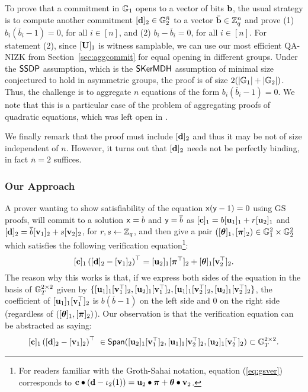 To prove that a commitment in $\mathbb{G}_1$ opens to a vector of bits $\mathbf{b}$, the usual strategy is to compute another commitment $[\mathbf{d}]_2\in\mathbb{G}_2^{\bar{n}}$ to a vector $\bar{\mathbf{b}}\in\mathbb{Z}_q^n$ and prove 
  (1) $b_i(\overline{b}_i-1)=0$, for all $i \in [n]$, and 
  (2) $b_i-\overline{b}_i=0$, for all $i \in [n]$. 
For statement  (2), since $[\mathbf{{U}}]_1$ is witness samplable, we can use our most efficient QA-NIZK from Section~\ref{sec:aggcommit} for equal opening in different groups.  Under the $\mathsf{SSDP}$ assumption, which is the $\mathsf{SKerMDH}$ assumption of minimal size conjectured to hold in asymmetric groups, the proof is of size $2(|\mathbb{G}_1|+|\mathbb{G}_2|)$. Thus, the challenge is to aggregate $n$ equations of the form $b_i(\overline{b}_i-1)=0$. We note that this is a particular case of the problem of aggregating proofs of quadratic equations, which was left open in \cite{C:JutRoy14}.

We finally remark that the proof must include $[\mathbf{d}]_2$ and thus it may be not of size independent of $n$. However, it turns out that $[\mathbf{d}]_2$ needs not be perfectly binding, in fact $\bar{n}=2$ suffices.

\subsubsection{Our Approach}

A prover wanting to show satisfiability of the equation  $\mathsf{x}(\mathsf{y}-1)=0$ using GS proofs, will commit to a solution  
$\mathsf{x}=b$ and $\mathsf{y}=\overline{b}$ as $[\mathbf{c}]_1=b [\mathbf{u}_1]_1 + r [\mathbf{u}_2]_1$ and 
 $[\mathbf{d}]_2=\overline{b} [\mathbf{v}_1]_2 + s [\mathbf{v}_2]_2$, for $r,s \leftarrow \mathbb{Z}_q$, and then give a pair $([{\boldsymbol \theta}]_1,[{\boldsymbol \pi}]_2)
\in \mathbb{G}_1^{2} \times \mathbb{G}_2^{2}$ which satisfies the following verification equation\footnote{For readers familiar with the Groth-Sahai notation, equation (\ref{eq:gsver}) corresponds to 
$\mathbf{c} \bullet \left(\mathbf{d}-\iota_2(1)\right) = \mathbf{u}_2 \bullet {\boldsymbol \pi} + {\boldsymbol \theta} \bullet \mathbf{v}_2$.}:
\begin{equation} \label{eq:gsver}
[\mathbf{c}]_1 \left([\mathbf{d}]_2-
 [{\mathbf{v}}_1]_2\right)^{\top}=[{\mathbf{u}}_2]_1  
[{\boldsymbol \pi}^{\top}]_2+ [{\boldsymbol \theta}]_1   [\mathbf{v}_2^{\top}]_2. 
\end{equation}
The reason why this works is that, if we express both sides of the equation in the basis of 
$\mathbb{G}_T^{2\times 2}$ given by 
$\{[\mathbf{u}_1]_1[\mathbf{v}_1^\top]_2,[\mathbf{u}_2]_1[\mathbf{v}_1^\top]_2,[\mathbf{u}_1]_1[\mathbf{v}_2^\top]_2,[\mathbf{u}_2]_1[\mathbf{v}_2^\top]_2\}$, the coefficient of 
$[\mathbf{u}_1]_1[\mathbf{v}_1^\top]_2$ is $b(\overline{b}-1)$ on the left side and $0$ on the right side (regardless of
$([{\boldsymbol \theta}]_1,[{\boldsymbol \pi}]_2)$).
Our observation is that the verification equation can be abstracted as saying:
\begin{equation}\label{eq:gsabstracted}
[\mathbf{c}]_1 \left([\mathbf{d}]_2-[\mathbf{v}_1]_2\right)^{\top} \ \in \mathsf{Span}([\mathbf{u}_2]_1[\mathbf{v}_1^\top]_2,[\mathbf{u}_1]_1[\mathbf{v}_2^\top]_2,[\mathbf{u}_2]_1[\mathbf{v}_2^\top]_2) \subset  \mathbb{G}_T^{2 \times 2}. 
\end{equation}


